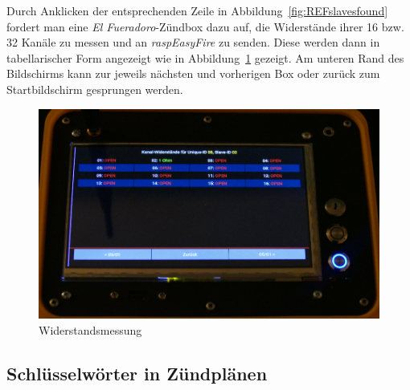 \documentclass[paper=a4, parskip, numbers=noenddot, toc=listof, headsepline]{scrbook}
\newcommand{\anlage}{\emph{El Fueradoro}}
\newcommand{\REF}{\emph{raspEasyFire}}
\begin{document}
				Durch Anklicken der entsprechenden Zeile in Abbildung~\ref{fig:REFslavesfound} fordert man eine {\anlage}-Zündbox dazu auf, die Widerstände ihrer 16 bzw. 32 Kanäle zu messen und an {\REF} zu senden. Diese werden dann in tabellarischer Form angezeigt wie in Abbildung~\ref{fig:REFimpedances} gezeigt. Am unteren Rand des Bildschirms kann zur jeweils nächsten und vorherigen Box oder zurück zum Startbildschirm gesprungen werden.

				\begin{figure}
					\centering\includegraphics[width=150mm]{Bilder/REFimpedances}
					\caption{Widerstandsmessung}
					\label{fig:REFimpedances}
				\end{figure}
			
			\subsection{Schlüsselwörter in Zündplänen}
			
\end{document}
